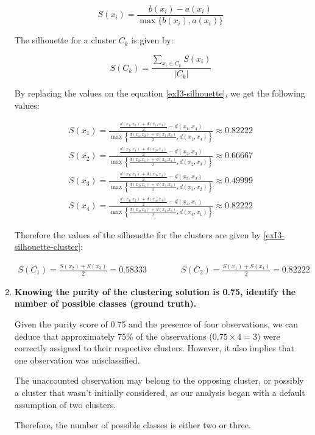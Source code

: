 \documentclass[12pt]{article}
\begin{document}
\begin{enumerate}[leftmargin=\labelsep]
          \begin{equation}\label{exI3-silhouette}
                S(x_i) = \frac{b(x_i) - a(x_i)}{\max\{b(x_i), a(x_i)\}}
          \end{equation}

          The silhouette for a cluster $C_k$ is given by:

          \begin{equation}\label{exI3-silhouette-cluster}
              S(C_k) = \frac{\sum_{x_i \in C_k} S(x_i)}{\left|C_k\right|}
          \end{equation}

          By replacing the values on the equation \eqref{exI3-silhouette}, we get the following values:

          \begingroup
          \allowdisplaybreaks
          \addtolength{\jot}{0.7em}
          \begin{align*}
              S(x_1) = \frac{\frac{d(x_1, x_2) \,+\, d(x_1, x_3)}{2} - d(x_1,x_4)}{\max\left\{\frac{d(x_1, x_2) \,+\, d(x_1, x_3)}{2}, d(x_1,x_4)\right\}} \approx 0.82222 \\
              S(x_2) = \frac{\frac{d(x_2, x_1) \,+\, d(x_2, x_4)}{2} - d(x_2,x_3)}{\max\left\{\frac{d(x_2, x_1) \,+\, d(x_2, x_4)}{2}, d(x_2,x_3)\right\}} \approx 0.66667 \\
              S(x_3) = \frac{\frac{d(x_3, x_1) \,+\, d(x_3, x_4)}{2} - d(x_3,x_2)}{\max\left\{\frac{d(x_3, x_1) \,+\, d(x_3, x_4)}{2}, d(x_3,x_2)\right\}} \approx 0.49999 \\
              S(x_4) = \frac{\frac{d(x_4, x_2) \,+\, d(x_4, x_3)}{2} - d(x_4,x_1)}{\max\left\{\frac{d(x_4, x_2) \,+\, d(x_4, x_3)}{2}, d(x_4,x_1)\right\}} \approx 0.82222
           \end{align*}
           \endgroup

           Therefore the values of the silhouette for the clusters are given by \eqref{exI3-silhouette-cluster}:

          \vskip -0.3cm
          \begin{align*}
              S(C_1) = \frac{S(x_2) + S(x_3)}{2} = 0.58333 \qquad\qquad
              S(C_2) = \frac{S(x_1) + S(x_4)}{2} = 0.82222
           \end{align*}


    \item \textbf{Knowing the purity of the clustering solution is 0.75, identify the number of possible classes (ground truth).}

          \vskip 0.3cm
          Given the purity score of 0.75 and the presence of four observations, we can deduce that approximately 75\% of the observations ($0.75 \times 4 = 3$)
           were correctly assigned to their respective clusters. However, it also implies that one observation was misclassified.

          The unaccounted observation may belong to the opposing cluster, or possibly a cluster that wasn't initially considered, as our analysis began with a
           default assumption of two clusters.

          Therefore, the number of possible classes is either two or three.
\end{enumerate}
\end{document}
